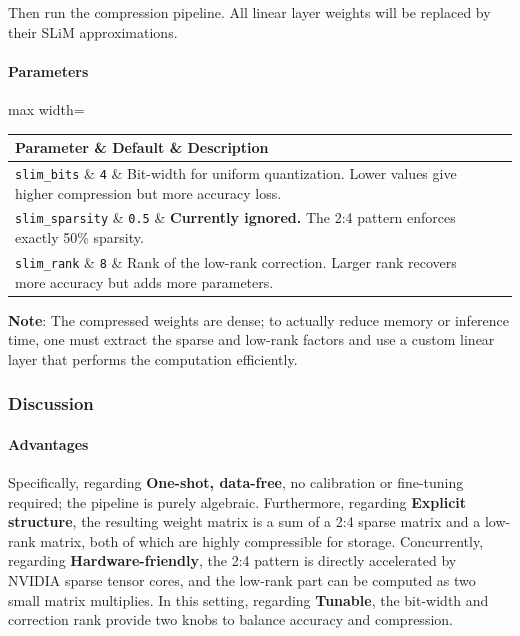 Then run the compression pipeline. All linear layer weights will be replaced by their SLiM approximations.

\paragraph{Parameters}

\begin{center}
\begin{adjustbox}{max width=\columnwidth}
\renewcommand{\arraystretch}{1.2}
\begin{tabular}{lll}
\toprule
Parameter \& Default \& Description \\
\midrule
\texttt{slim\_bits} \& \texttt{4} \& Bit-width for uniform quantization. Lower values give higher compression but more accuracy loss. \\
\texttt{slim\_sparsity} \& \texttt{0.5} \& \textbf{Currently ignored.} The 2:4 pattern enforces exactly 50\% sparsity. \\
\texttt{slim\_rank} \& \texttt{8} \& Rank of the low-rank correction. Larger rank recovers more accuracy but adds more parameters. \\

\bottomrule
\end{tabular}
\end{adjustbox}
\end{center}
\textbf{Note}: The compressed weights are dense; to actually reduce memory or inference time, one must extract the sparse and low-rank factors and use a custom linear layer that performs the computation efficiently.


\subsubsection*{Discussion}

\paragraph{Advantages}

Specifically, regarding \textbf{One-shot, data-free}, no calibration or fine-tuning required; the pipeline is purely algebraic. Furthermore, regarding \textbf{Explicit structure}, the resulting weight matrix is a sum of a 2:4 sparse matrix and a low-rank matrix, both of which are highly compressible for storage. Concurrently, regarding \textbf{Hardware-friendly}, the 2:4 pattern is directly accelerated by NVIDIA sparse tensor cores, and the low-rank part can be computed as two small matrix multiplies. In this setting, regarding \textbf{Tunable}, the bit-width and correction rank provide two knobs to balance accuracy and compression.


